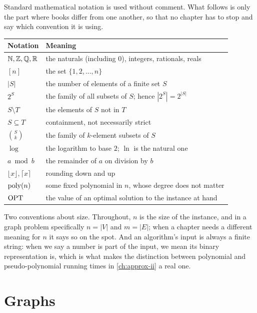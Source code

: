 Standard mathematical notation is used without comment. What follows is only
the part where books differ from one another, so that no chapter has to stop
and say which convention it is using.

\begin{center}
\begin{tabular}{@{}ll@{}}
\toprule
Notation & Meaning \\
\midrule
$\mathbb{N}, \mathbb{Z}, \mathbb{Q}, \mathbb{R}$ & the naturals (including $0$), integers, rationals, reals \\
$[n]$ & the set $\{1, 2, \ldots, n\}$ \\
$|S|$ & the number of elements of a finite set $S$ \\
$2^{S}$ & the family of all subsets of $S$; hence $|2^S| = 2^{|S|}$ \\
$S \setminus T$ & the elements of $S$ not in $T$ \\
$S \subseteq T$ & containment, not necessarily strict \\
$\binom{S}{k}$ & the family of $k$-element subsets of $S$ \\
$\log$ & the logarithm to base $2$; $\ln$ is the natural one \\
$a \bmod b$ & the remainder of $a$ on division by $b$ \\
$\lfloor x \rfloor, \lceil x \rceil$ & rounding down and up \\
$\mathrm{poly}(n)$ & some fixed polynomial in $n$, whose degree does not matter \\
$\mathrm{OPT}$ & the value of an optimal solution to the instance at hand \\
\bottomrule
\end{tabular}
\end{center}

Two conventions about size. Throughout, $n$ is the size of the instance, and in
a graph problem specifically $n = |V|$ and $m = |E|$; when a chapter needs a
different meaning for $n$ it says so on the spot. And an algorithm's input is
always a finite string: when we say a number is part of the input, we mean its
binary representation is, which is what makes the distinction between
polynomial and pseudo-polynomial running times in \cref{ch:approx-ii} a real
one.

\section{Graphs}
\label{sec:prelim-graphs}

